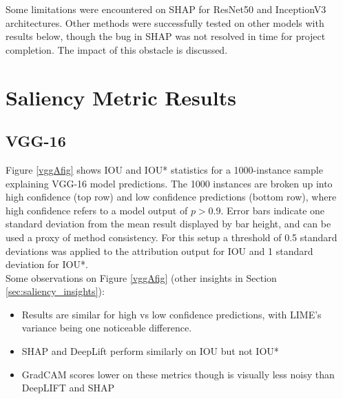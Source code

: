 \documentclass[main]{subfiles}
\begin{document}
Some limitations were encountered on SHAP for ResNet50 and InceptionV3 architectures. Other methods were successfully tested on other models with results below, though the bug in SHAP was not resolved in time for project completion. The impact of this obstacle is discussed.

\section{Saliency Metric Results}
\subsection{VGG-16} \label{sec:vggExp}

Figure \ref{vggAfig} shows IOU and IOU* statistics for a 1000-instance sample explaining VGG-16 model predictions. The 1000 instances are broken up into high confidence (top row) and low confidence predictions (bottom row), where high confidence refers to a model output of $p>0.9$. Error bars indicate one standard deviation from the mean result displayed by bar height, and can be used a proxy of method consistency. For this setup a threshold of 0.5 standard deviations was applied to the attribution output for IOU and 1 standard deviation for IOU*.\\

\vspace{0.2in}
Some observations on Figure \ref{vggAfig} (other insights in Section \ref{sec:saliency_insights}):
\begin{itemize}
\item Results are similar for high vs low confidence predictions, with LIME's variance being one noticeable difference.
\item SHAP and DeepLift perform similarly on IOU but not IOU*
\item GradCAM scores lower on these metrics though is visually less noisy than DeepLIFT and SHAP
\end{itemize}


\newpage

\end{document}
